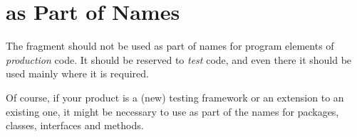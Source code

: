 \section{ as Part of Names}
The fragment  should not be used as part of names for program elements of \textit{production} code. It should be reserved to \textit{test} code, and even there it should be used mainly where it is required.

Of course, if your product is a (new) testing framework or an extension to an existing one, it might be necessary to use  as part of the names for packages, classes, interfaces and
methods.

